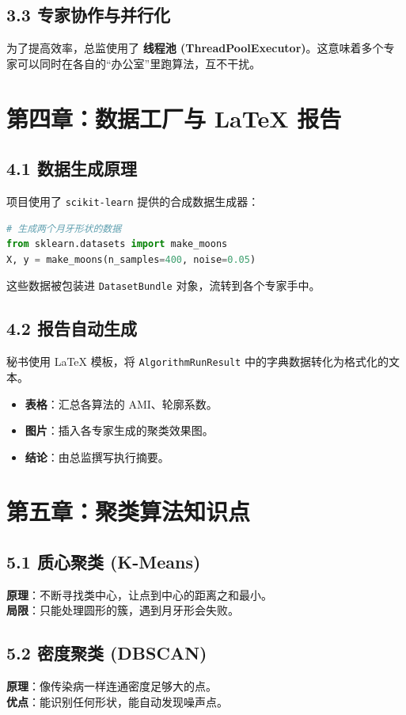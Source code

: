 \documentclass[11pt,a4paper]{article}
\begin{document}
\subsection{3.3 专家协作与并行化}
为了提高效率，总监使用了 \textbf{线程池 (ThreadPoolExecutor)}。这意味着多个专家可以同时在各自的“办公室”里跑算法，互不干扰。

\section{第四章：数据工厂与 LaTeX 报告}

\subsection{4.1 数据生成原理}
项目使用了 \texttt{scikit-learn} 提供的合成数据生成器：
\begin{lstlisting}[language=Python]
# 生成两个月牙形状的数据
from sklearn.datasets import make_moons
X, y = make_moons(n_samples=400, noise=0.05)
\end{lstlisting}
这些数据被包装进 \texttt{DatasetBundle} 对象，流转到各个专家手中。

\subsection{4.2 报告自动生成}
秘书使用 LaTeX 模板，将 \texttt{AlgorithmRunResult} 中的字典数据转化为格式化的文本。
\begin{itemize}
    \item \textbf{表格}：汇总各算法的 AMI、轮廓系数。
    \item \textbf{图片}：插入各专家生成的聚类效果图。
    \item \textbf{结论}：由总监撰写执行摘要。
\end{itemize}

\section{第五章：聚类算法知识点}

\subsection{5.1 质心聚类 (K-Means)}
\textbf{原理}：不断寻找类中心，让点到中心的距离之和最小。\\
\textbf{局限}：只能处理圆形的簇，遇到月牙形会失败。

\subsection{5.2 密度聚类 (DBSCAN)}
\textbf{原理}：像传染病一样连通密度足够大的点。\\
\textbf{优点}：能识别任何形状，能自动发现噪声点。
\end{document}
